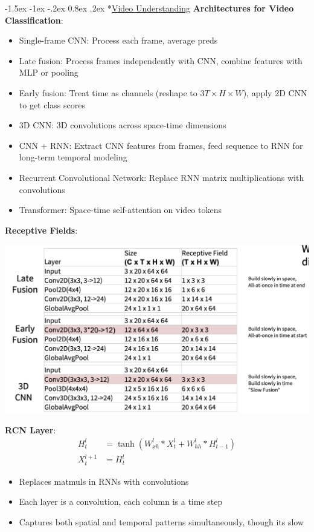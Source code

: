 \documentclass{article}
\makeatletter
\renewcommand\section{\@startsection{section}{1}{\z@}%
                                  {-1.5ex \@plus -1ex \@minus -.2ex}%
                                  {0.8ex \@plus.2ex}%
                                  {\normalfont\small\bfseries}}
\makeatother
\begin{document}
\begin{multicols}{3}
\section*{\underline{Video Understanding}}
\textbf{Architectures for Video Classification}:
\begin{itemize}
\item Single-frame CNN: Process each frame, average preds
\item Late fusion: Process frames independently with CNN, combine features with MLP or pooling
\item Early fusion: Treat time as channels (reshape to $3T \times H \times W$), apply 2D CNN to get class scores
\item 3D CNN: 3D convolutions across space-time dimensions
\item CNN + RNN: Extract CNN features from frames, feed sequence to RNN for long-term temporal modeling
\item Recurrent Convolutional Network: Replace RNN matrix multiplications with convolutions
\item Transformer: Space-time self-attention on video tokens
\end{itemize}

\textbf{Receptive Fields}:

\includegraphics[width=\columnwidth]{imgs/video.png}

\textbf{RCN Layer}:
\begin{align*}
H_t^l &= \tanh(W_{xh}^l * X_t^l + W_{hh}^l * H_{t-1}^l)\\
X_t^{l+1} &= H_t^l
\end{align*}
\begin{itemize}
\item Replaces matmuls in RNNs with convolutions
\item Each layer is a convolution, each column is a time step
\item Captures both spatial and temporal patterns simultaneously, though its slow
\end{itemize}


\end{multicols}
\end{document}
